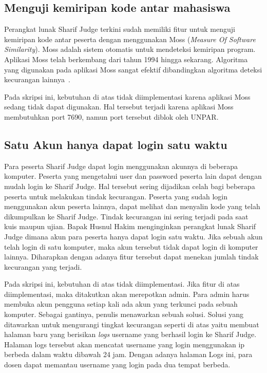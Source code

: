 \subsection{Menguji kemiripan kode antar mahasiswa}
Perangkat lunak Sharif Judge terkini sudah memiliki fitur untuk menguji kemiripan kode antar peserta dengan menggunakan Moss (\textit{Measure Of Software Similarity}). Moss adalah sistem otomatis untuk mendeteksi kemiripan program. Aplikasi Moss telah berkembang dari tahun 1994 hingga sekarang. Algoritma yang digunakan pada aplikasi Moss sangat efektif dibandingkan algoritma deteksi kecurangan lainnya~\cite{aiken:10:moss}. 

Pada skripsi ini, kebutuhan di atas tidak diimplementasi karena aplikasi Moss sedang tidak dapat digunakan. Hal tersebut terjadi karena aplikasi Moss membutuhkan port 7690, namun port tersebut diblok oleh UNPAR.

\subsection{Satu Akun hanya dapat login satu waktu}
Para peserta Sharif Judge dapat login menggunakan akunnya di beberapa komputer. Peserta yang mengetahui user dan password peserta lain dapat dengan mudah login ke Sharif Judge. Hal tersebut sering dijadikan celah bagi beberapa peserta untuk melakukan tindak kecurangan. Peserta yang sudah login menggunakan akun peserta lainnya, dapat melihat dan menyalin kode yang telah dikumpulkan ke Sharif Judge. Tindak kecurangan ini sering terjadi pada saat kuis maupun ujian. Bapak Husnul Hakim menginginkan perangkat lunak Sharif Judge dimana akun para peserta hanya dapat login satu waktu. Jika sebuah akun telah login di satu komputer, maka akun tersebut tidak dapat login di komputer lainnya. Diharapkan dengan adanya fitur tersebut dapat menekan jumlah tindak kecurangan yang terjadi. 

Pada skripsi ini, kebutuhan di atas tidak diimplementasi. Jika fitur di atas diimplementasi, maka ditakutkan akan merepotkan admin. Para admin harus membuka akun pengguna setiap kali ada akun yang terkunci pada sebuah komputer. Sebagai gantinya, penulis menawarkan sebuah solusi. Solusi yang ditawarkan untuk mengurangi tingkat kecurangan seperti di atas yaitu membuat halaman baru yang berisikan \textit{logs} username yang berhasil login ke Sharif Judge. Halaman logs tersebut akan mencatat username yang login menggunakan ip berbeda dalam waktu dibawah 24 jam. Dengan adanya halaman Logs ini, para dosen dapat memantau username yang login pada dua tempat berbeda.	

